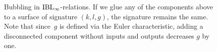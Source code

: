 \documentclass[\MainFolder/Text.tex]{subfiles}
\begin{document}
\begin{figure}
{%
%
%
%
Bubbling in $\mathrm{IBL}_\infty$-relations. If we glue any of the components above to a surface of signature $(k,l,g)$, the signature remains the same. Note that since~$g$ is defined via the Euler characteristic, adding a disconnected component without inputs and outputs decreases $g$ by one.}
\label{Fig:Bubbling}
\end{figure}
\end{document}
